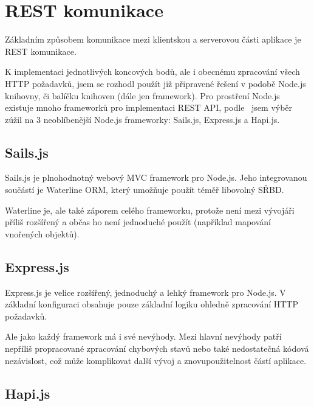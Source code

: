 
\section{REST komunikace}\label{sec:restKomunikace}

Základním způsobem komunikace mezi klientskou a serverovou části aplikace je \gls{REST} komunikace.

K implementaci jednotlivých koncových bodů, ale i obecnému zpracování všech \gls{HTTP} požadavků, jsem se rozhodl použít již připravené řešení v podobě Node.js knihovny, či balíčku knihoven (dále jen framework).
Pro prostření Node.js existuje mnoho frameworků pro implementaci \gls{REST} \gls{API}, podle~\cite{node:framework} jsem výběr zúžil na 3 neoblíbenější Node.js frameworky: Sails.js, Express.js a Hapi.js.

\subsection{Sails.js}\label{subsec:sails.js}

Sails.js je plnohodnotný webový \gls{MVC} framework pro Node.js.
Jeho integrovanou součástí je Waterline \gls{ORM}, který umožňuje použít téměř libovolný \gls{SŘBD}.

Waterline je, ale také záporem celého frameworku, protože není mezi vývojáři příliš rozšířený a občas ho není jednoduché použít (například mapování vnořených objektů).

\subsection{Express.js}\label{subsec:express.js}

Express.js je velice rozšířený, jednoduchý a lehký framework pro Node.js.
V základní konfiguraci obsahuje pouze základní logiku ohledně zpracování \gls{HTTP} požadavků.

Ale jako každý framework má i své nevýhody.
Mezi hlavní nevýhody patří nepříliš propracované zpracování chybových stavů nebo také nedostatečná kódová nezávislost, což může komplikovat další vývoj a znovupoužitelnost částí aplikace.

\subsection{Hapi.js}\label{subsec:hapi.js}

